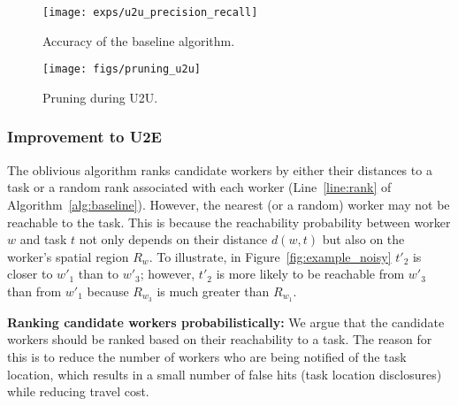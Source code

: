 \documentclass{USC-Thesis}
\numberwithin{equation}{chapter}
\begin{document}
\begin{figure}[!ht]
	\begin{minipage}[b]{0.45\linewidth}
		\centering
		\texttt{[image: exps/u2u\_precision\_recall]}
        \captionsetup{format=hang}
		\caption{Accuracy of the baseline algorithm.}
		\label{fig:u2u_precision_recall}
	\end{minipage}
	\vspace{5pt}
	\begin{minipage}[b]{0.55\linewidth}
		\centering
		\texttt{[image: figs/pruning\_u2u]}
        \captionsetup{format=hang}
		\caption{Pruning during U2U.}
		\label{fig:pruning_u2u}
	\end{minipage}
\end{figure}


\subsubsection{Improvement to U2E}
\label{sec:u2e_improve}

The oblivious algorithm ranks candidate workers by either their distances to a task or a random rank associated with each worker (Line~\ref{line:rank} of Algorithm~\ref{alg:baseline}). However, the nearest (or a random) worker may not be reachable to the task. This is because the reachability probability between worker $w$ and task $t$ not only depends on their distance $d(w,t)$ but also on the worker's spatial region $R_w$. To illustrate, in Figure~\ref{fig:example_noisy} $t'_2$ is closer to $w'_1$ than to $w'_3$; however, $t'_2$ is more likely to be reachable from $w'_3$ than from $w'_1$ because $R_{w_3}$ is much greater than $R_{w_1}$.

\textbf{Ranking candidate workers probabilistically:}
We argue that the candidate workers should be ranked based on their reachability to a task. The reason for this is to reduce the number of workers who are being notified of the task location, which results in a small number of false hits (task location disclosures) while reducing travel cost.
\end{document}
